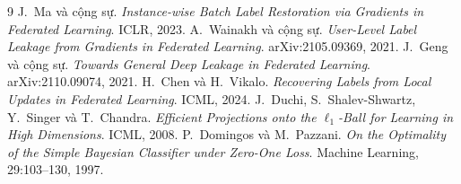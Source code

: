 \documentclass[11pt]{article}
\theoremstyle{remark}
\begin{document}
\begin{thebibliography}{9}
 J.~Ma và cộng sự.
  \emph{Instance-wise Batch Label Restoration via Gradients in Federated
  Learning}. ICLR, 2023.
 A.~Wainakh và cộng sự.
  \emph{User-Level Label Leakage from Gradients in Federated Learning}.
  arXiv:2105.09369, 2021.
 J.~Geng và cộng sự.
  \emph{Towards General Deep Leakage in Federated Learning}.
  arXiv:2110.09074, 2021.
 H.~Chen và H.~Vikalo.
  \emph{Recovering Labels from Local Updates in Federated Learning}.
  ICML, 2024.
 J.~Duchi, S.~Shalev-Shwartz, Y.~Singer và T.~Chandra.
  \emph{Efficient Projections onto the $\ell_1$-Ball for Learning in High
  Dimensions}. ICML, 2008.
 P.~Domingos và M.~Pazzani.
  \emph{On the Optimality of the Simple Bayesian Classifier under Zero-One
  Loss}. Machine Learning, 29:103--130, 1997.
\end{thebibliography}
\end{document}
